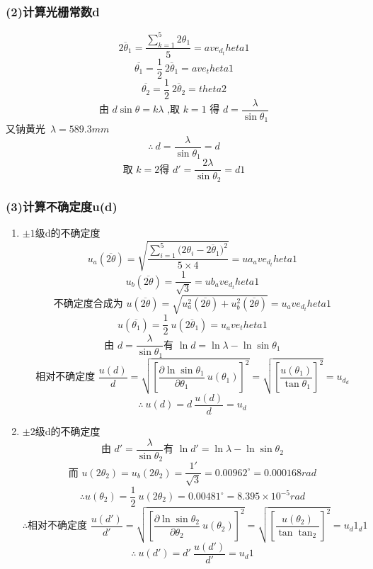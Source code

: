 \subsubsection*{(2)计算光栅常数d}

$$\overline{2{\theta}_1} = \displaystyle\frac{\sum_{k=1}^5 2{\theta}_1}{5} = {{ave_d_theta1}} $$
$$\overline{ {\theta}_1} = \displaystyle\frac12\ \overline{2{\theta}_1} = {{ave_theta1}} $$
$$\overline{ {\theta}_2} = \displaystyle\frac12\ \overline{2{\theta}_2} = {{theta2}}$$
$$\text{由\ }d\sin{\theta} = k{\lambda}\text{\ ,取\ }k = 1\text{\ 得\ }d = \frac{\lambda}{\sin{\theta}_1}$$
又钠黄光\ ${\lambda} = 589.3mm$
$$\therefore \ d = \displaystyle\frac{\lambda}{\sin{\theta}_1}={{d}}$$
$$\text{取\ }k=2 \displaystyle\text{得\ }d' = \frac{2\lambda}{\sin{\theta}_2}= {{d1}}$$
 
\subsubsection*{(3)计算不确定度u(d)}
\begin{enumerate}
  \item $\pm1$级d的不确定度
    $$u_a(\overline{2\theta}) = \displaystyle\sqrt{\frac{\sum_{i=1}^5{(2{\theta}_i-\overline{2{\theta}_1}})^2}{5\times4}}={{ua_ave_d_theta1}}$$
    $$u_b(\overline{2\theta}) = \displaystyle\frac{1}{\sqrt3} = {{ub_ave_d_theta1}}$$
    $$\text{不确定度合成为\ }u(\overline{2\theta}) = \sqrt{u_a^2(\overline{2\theta})+u_b^2(\overline{2\theta})} = {{u_ave_d_theta1}}$$
    $$u(\overline{ {\theta}_1})= \displaystyle\frac12\ u(\overline{2{\theta}_1}) = {{u_ave_theta1}}$$
    $$\text{由\ }d = \frac{\lambda}{\sin{ {\theta}_1}} \text{有\ } \ln d = \ln{\lambda}-\ln{\sin{ {\theta}_1} }$$
    $$\text{相对不确定度\ }\frac{u(d)}{d} = \displaystyle\sqrt{ {\left[\frac{\partial{\ln{\sin{ {\theta}_1}}}}{\partial{ {\theta}_1} }\ u({\theta}_1)\right]}^2} = \sqrt{ {\left[\frac{u({\theta}_1)}{\tan{ {\theta}_1}}\right]}^2} = {{u_d_d}}$$
    $$\therefore \ u(d) = \displaystyle d\ \frac{u(d)}{d} = {{u_d}}$$
  \item $\pm2$级d的不确定度
    $$\text{由\ }d' = \frac{\lambda}{\sin{ {\theta}_2}} \text{有\ } \ln d' = \ln{\lambda}-\ln{\sin{ {\theta}_2}}$$
    $$\text{而\ }u(2{\theta}_2) = u_b(2{\theta}_2) = \displaystyle\frac{1'}{\sqrt3} = {0.00962}^\circ = 0.000168rad $$
    $$\therefore u({\theta}_2) = \displaystyle\frac{1}{2}\ u(2{\theta}_2) = {0.00481}^{\circ} = 8.395\times 10^{-5}rad $$
    $$\therefore \text{相对不确定度\ }\frac{u(d')}{d'} = \displaystyle\sqrt{ {\left[\frac{\partial{\ln{\sin{ {\theta}_2}}}}{\partial{  {\theta}_2} }\ u({\theta}_2)\right]}^2} = \sqrt{ {\left[\frac{u({\theta}_2)}{\tan{ {\tan}_2}}\right]}^2} = {{u_d1_d1}}$$
    $$\therefore \ u(d') = \displaystyle d'\ \frac{u(d')}{d'} = {{u_d1}}$$
\end{enumerate}

